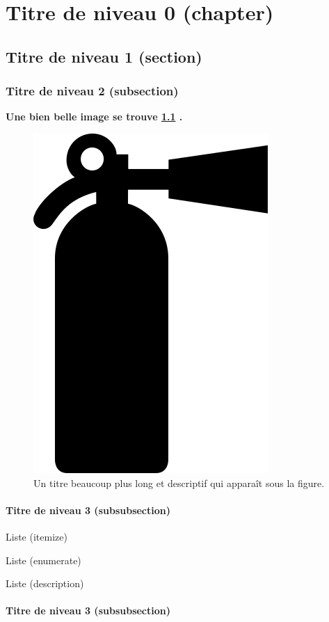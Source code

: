 \chapter{Titre de niveau 0 (chapter)}
\thispagestyle{plainNormal}


\blindtext


\section{Titre de niveau 1 (section)}
\blindtext

	\subsection{Titre de niveau 2 (subsection)}
\blindtext

\textbf{Une bien belle image se trouve \cref{fig10} .}

\begin{figure}[h]
\begin{center}
	\includegraphics[width=.3\textwidth]{figures/part1/figure_10.png}
	\caption[Titre court table des matières]{Un titre beaucoup plus long et descriptif qui apparaît sous la figure.}
	\label{fig10}
\end{center}
\end{figure}

		\subsubsection{Titre de niveau 3 (subsubsection)}
\blindtext

\medskip
Liste (itemize)
\blinditemize

\medskip
Liste (enumerate)
\blindenumerate

\medskip
Liste (description)
\blinddescription

		\subsubsection{Titre de niveau 3 (subsubsection)}
